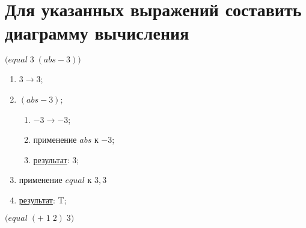 
\section{Для указанных выражений составить диаграмму вычисления}

\problem $\bigl(equal\; 3\; (abs -\!3)\bigr)$

\begin{enumerate}
	\item $3 \to 3$;
	\item $(abs -\!3)$;
	\begin{enumerate}
		\item $-3 \to -3$;
		\item применение $abs$ к $-3$;
		\item \underline{результат}: $3$;
	\end{enumerate}
	\item применение $equal$ к $3, 3$
	\item \underline{результат}: T;
\end{enumerate}


\problem $\bigl(equal\; (+\; 1\; 2)\; 3\bigr)$